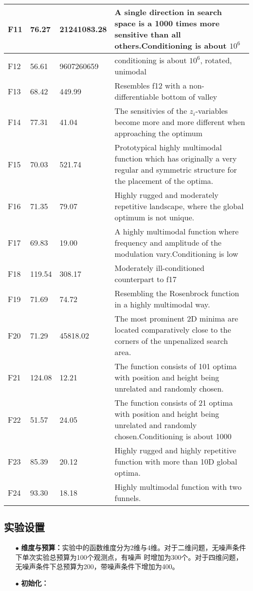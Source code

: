 \documentclass[a4paper,10pt]{article}
\begin{document}
\begin{table}[H]
{\begin{tabular}{|l|l|l|l|}
        F11 & 76.27 & 21241083.28 & A single direction in search space is a 1000 times more sensitive than all others.Conditioning is about $10^6$ \\ \hline
        F12 & 56.61 & 9607260659 & conditioning is about $10^6$, rotated, unimodal \\ \hline
        F13 & 68.42 & 449.99 & Resembles f12 with a non-differentiable bottom of valley \\ \hline
        F14 & 77.31 & 41.04 & The sensitivies of the $z_i$-variables become more and more different when approaching the optimum \\ \hline
        F15 & 70.03 & 521.74 & Prototypical highly multimodal function which has originally a very regular and symmetric structure for the placement of the optima. \\ \hline
        F16 & 71.35 & 79.07 & Highly rugged and moderately repetitive landscape, where the global optimum is not unique. \\ \hline
        F17 & 69.83 & 19.00  & A highly multimodal function where frequency and amplitude of the modulation vary.Conditioning is low \\ \hline
        F18 & 119.54 & 308.17 & Moderately ill-conditioned counterpart to f17 \\ \hline
        F19 & 71.69 & 74.72 & Resembling the Rosenbrock function in a highly multimodal way. \\ \hline
        F20 & 71.29 & 45818.02 & The most prominent 2D minima are located comparatively close to the corners of the unpenalized search area. \\ \hline
        F21 & 124.08 & 12.21 & The function consists of 101 optima with position and height being unrelated and randomly chosen. \\ \hline
        F22 & 51.57 & 24.05 & The function consists of 21 optima with position and height being unrelated and randomly chosen.Conditioning is about 1000 \\ \hline
        F23 & 85.39 & 20.12 & Highly rugged and highly repetitive function with more than 10D global optima. \\ \hline
        F24 & 93.30  & 18.18 &  Highly multimodal function with two funnels. \\ \hline
    \end{tabular}
    }
\end{table}
  \subsection{实验设置}
\begin{itemize}
  \item[$\bullet$] \textbf{维度与预算：}实验中的函数维度分为2维与4维。对于二维问题，无噪声条件下单次实验总预算为100个观测点，有噪声
  时增加为300个。对于四维问题，无噪声条件下总预算为200，带噪声条件下增加为400。
  \item[$\bullet$] \textbf{初始化：}
\end{itemize}



\medskip


\end{document}
